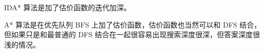 

IDA* 算法是加了估价函数的迭代加深。

A* 算法是在优先队列 BFS 上加了估价函数，估价函数也当然可以和 DFS 结合，但如果只是和最普通的 DFS 结合在一起很容易出现搜索深度很深，但答案深度很浅的情况。
